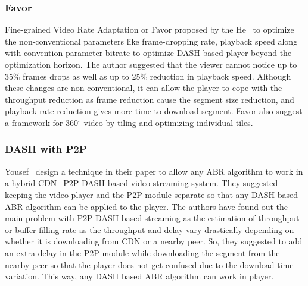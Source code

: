 \subsubsection{Favor}
Fine-grained Video Rate Adaptation or Favor\cite{10.1145/3204949.3204957} proposed by the He \etal\ to optimize the non-conventional parameters like frame-dropping rate, playback speed along with convention parameter bitrate to optimize DASH based player beyond the optimization horizon. The author suggested that the viewer cannot notice up to 35\% frames drops as well as up to 25\% reduction in playback speed. Although these changes are non-conventional, it can allow the player to cope with the throughput reduction as frame reduction cause the segment size reduction, and playback rate reduction gives more time to download segment. Favor also suggest a framework for 360$^{\circ}$ video by tiling and optimizing individual tiles.

\subsubsection{DASH with P2P}
Yousef \etal\ design a technique in their paper \cite{10.1145/3339825.3391859} to allow any ABR algorithm to work in a hybrid CDN+P2P DASH based video streaming system. They suggested keeping the video player and the P2P module separate so that any DASH based ABR algorithm can be applied to the player. The authors have found out the main problem with P2P DASH based streaming as the estimation of throughput or buffer filling rate as the throughput and delay vary drastically depending on whether it is downloading from CDN or a nearby peer. So, they suggested to add an extra delay in the P2P module while downloading the segment from the nearby peer so that the player does not get confused due to the download time variation. This way, any DASH based ABR algorithm can work in player.
